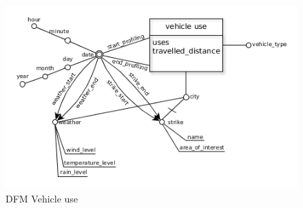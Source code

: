 \begin{figure}[H]                                                                                                                                                            
\centering                                                                                                                                                                   
\includegraphics[width=\textwidth]{diagrams/dfm}                                                                                                                                   
\caption{DFM Vehicle use}                                                                                                                                            
\label{fig:dfm}                                                                                                                                                           
\end{figure}

